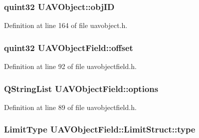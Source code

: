 \hypertarget{group___u_a_v_objects_plugin_gafc50acdaa311c9fd9aaddf90fd578c14}{
\subsubsection[{obj\-I\-D}]{\setlength{\rightskip}{0pt plus 5cm}quint32 {\bf \-U\-A\-V\-Object\-::obj\-I\-D}}}\label{group___u_a_v_objects_plugin_gafc50acdaa311c9fd9aaddf90fd578c14}


\-Definition at line 164 of file uavobject.\-h.

\hypertarget{group___u_a_v_objects_plugin_ga8d473734be71fe3a3dbcd1a854b497f2}{
\subsubsection[{offset}]{\setlength{\rightskip}{0pt plus 5cm}quint32 {\bf \-U\-A\-V\-Object\-Field\-::offset}}}\label{group___u_a_v_objects_plugin_ga8d473734be71fe3a3dbcd1a854b497f2}


\-Definition at line 92 of file uavobjectfield.\-h.

\hypertarget{group___u_a_v_objects_plugin_ga97fe1c3ed2d74eb06ea7e24abf4ce09c}{
\subsubsection[{options}]{\setlength{\rightskip}{0pt plus 5cm}\-Q\-String\-List {\bf \-U\-A\-V\-Object\-Field\-::options}}}\label{group___u_a_v_objects_plugin_ga97fe1c3ed2d74eb06ea7e24abf4ce09c}


\-Definition at line 89 of file uavobjectfield.\-h.

\hypertarget{group___u_a_v_objects_plugin_ga7f346cc2754bc63a0a0ae587b183b3ff}{
\subsubsection[{type}]{\setlength{\rightskip}{0pt plus 5cm}\-Limit\-Type {\bf \-U\-A\-V\-Object\-Field\-::\-Limit\-Struct\-::type}}}\label{group___u_a_v_objects_plugin_ga7f346cc2754bc63a0a0ae587b183b3ff}


